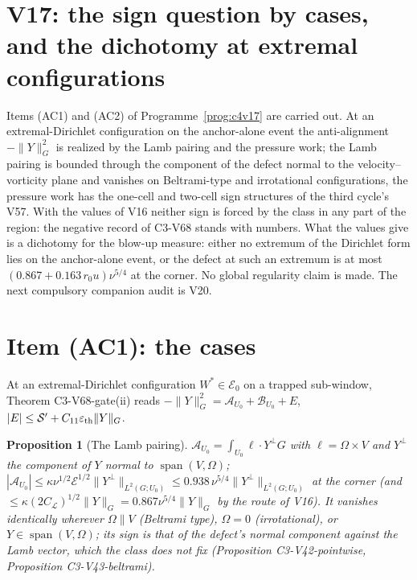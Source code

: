\documentclass[11pt]{article}
\theoremstyle{plain}
\newtheorem{proposition}[theorem]{Proposition}
\theoremstyle{definition}
\theoremstyle{remark}
\begin{document}
\section{V17: the sign question by cases, and the dichotomy at extremal configurations}
\label{sec:c4v17-entry}

Items (AC1) and (AC2) of Programme~\ref{prog:c4v17} are carried out.
At an extremal-Dirichlet configuration on the anchor-alone event the
anti-alignment \(-\|Y\|_G^2\) is realized by the Lamb pairing and the
pressure work; the Lamb pairing is bounded through the component of
the defect normal to the velocity--vorticity plane and vanishes on
Beltrami-type and irrotational configurations, the pressure work has
the one-cell and two-cell sign structures of the third cycle's V57.
With the values of V16 neither sign is forced by the class in any
part of the region: the negative record of C3-V68 stands with
numbers.  What the values give is a dichotomy for the blow-up
measure: either no extremum of the Dirichlet form lies on the
anchor-alone event, or the defect at such an extremum is at most
\((0.867+0.163\,r_0u)\nu^{5/4}\) at the corner.  No global regularity claim is
made.  The next compulsory companion audit is V20.

\section{Item (AC1): the cases}
\label{sec:c4v17-cases}

At an extremal-Dirichlet configuration \(W^*\in\mathcal E_0\) on a trapped
sub-window, Theorem C3-V68-gate(ii) reads
\(-\|Y\|_G^2=\mathcal A_{U_0}+\mathcal B_{U_0}+E\), \(|E|\le\mathcal S'+C_{11}\varepsilon_{\rm th}\|Y\|_G\).

\begin{proposition}[The Lamb pairing]
\label{prop:c4v17-lamb}
\(\mathcal A_{U_0}=\int_{U_0}\ell\cdot Y^\perp G\) with \(\ell=\Omega\times V\) and \(Y^\perp\) the component of \(Y\)
normal to \(\operatorname{span}(V,\Omega)\); \(|\mathcal A_{U_0}|\le\kappa\nu^{1/2}\mathcal E^{1/2}\|Y^\perp\|_{L^2(G;U_0)}\le0.938\,\nu^{5/4}\|Y^\perp\|_{L^2(G;U_0)}\)
at the corner (and \(\le\kappa(2C_{\mathcal L})^{1/2}\|Y\|_G=0.867\nu^{5/4}\|Y\|_G\) by the route of V16).
It vanishes identically wherever \(\Omega\parallel V\) (Beltrami type),
\(\Omega=0\) (irrotational), or \(Y\in\operatorname{span}(V,\Omega)\); its sign is that of the defect's
normal component against the Lamb vector, which the class does not
fix (Proposition C3-V42-pointwise, Proposition C3-V43-beltrami).
\end{proposition}
\end{document}
